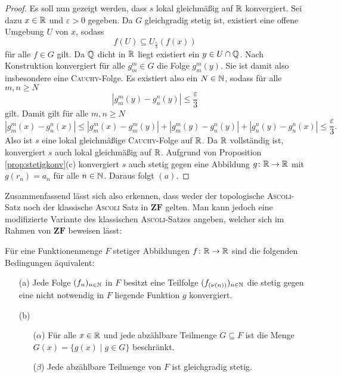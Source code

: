 \begin{proof}
  Es soll nun gezeigt werden, dass $s$ lokal gleichmäßig auf $\mathbb{R}$ konvergiert.
  Sei dazu $x \in \mathbb{R}$ und $\varepsilon > 0$ gegeben.
  Da $G$ gleichgradig stetig ist, existiert eine offene Umgebung $U$ von $x$, sodass
  \begin{displaymath}
    f(U) \subseteq U_\frac{\varepsilon}{3}(f(x))
  \end{displaymath}
  für alle $f \in G$ gilt.
  Da $\mathbb{Q}$ dicht in $\mathbb{R}$ liegt existiert ein $y \in U \cap \mathbb{Q}$.
  Nach Konstruktion konvergiert für alle $g_m^m \in G$ die Folge $g_m^m(y)$.
  Sie ist damit also insbesondere eine \textsc{Cauchy}-Folge.
  Es existiert also ein $N \in \mathbb{N}$, sodass für alle $m,n \geq N$
  \begin{displaymath}
    | g_m^m(y) - g_n^n(y) | \leq \frac{\varepsilon}{3}
  \end{displaymath}
  gilt.
  Damit gilt für alle $m, n \geq N$
  \begin{displaymath}
    | g_m^m(x) - g_n^n(x) |
    \leq 
    | g_m^m(x) - g_m^m(y) | +  | g_m^m(y) - g_n^n(y) | +  | g_n^n(y) - g_n^n(x) |
    \leq
    \frac{\varepsilon}{3}.
  \end{displaymath}
  Also ist $s$ eine lokal gleichmäßige \textsc{Cauchy}-Folge auf $\mathbb{R}$.
  Da $\mathbb{R}$ vollständig ist, konvergiert $s$ auch lokal gleichmäßig auf $\mathbb{R}$. 
  Aufgrund von Proposition \ref{prop:stetigkonv}(c) konvergiert $s$ auch stetig gegen eine Abbildung $g \colon \mathbb{R} \to \mathbb{R}$ mit $g(r_n) = a_n$ für alle $n \in \mathbb{N}$.
  Daraus folgt $(a)$.
\end{proof}

Zusammenfassend lässt sich also erkennen, dass weder der topologische \textsc{Ascoli}-Satz noch der klassische \textsc{Ascoli} Satz in $\mathbf{ZF}$ gelten. Man kann jedoch eine modifizierte Variante des klassischen \textsc{Ascoli}-Satzes angeben, welcher sich im Rahmen von $\mathbf{ZF}$ beweisen lässt:

\begin{thm}
  Für eine Funktionenmenge $F$ stetiger Abbildungen $f \colon \mathbb{R} \to \mathbb{R}$ sind die folgenden Bedingungen äquivalent:
  \begin{itemize}
    \item[(a)] Jede Folge $(f_n)_{n \in \mathbb{N}}$ in $F$ besitzt eine Teilfolge $(f_{(\nu(n))})_{n \in \mathbb{N}}$ die stetig gegen eine nicht notwendig in $F$ liegende Funktion $g$ konvergiert.

    \item[(b)]
      \begin{itemize}
        \item[($\alpha$)] Für alle $x \in \mathbb{R}$ und jede abzählbare Teilmenge $G \subseteq F$ ist die Menge $G(x) = \{ g(x) \mid g \in G \}$ beschränkt.
        \item[($\beta$)] Jede abzählbare Teilmenge von $F$ ist gleichgradig stetig.
      \end{itemize}
  \end{itemize}
\end{thm}

